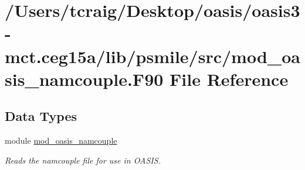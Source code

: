 \hypertarget{mod__oasis__namcouple_8_f90}{\section{/\+Users/tcraig/\+Desktop/oasis/oasis3-\/mct.ceg15a/lib/psmile/src/mod\+\_\+oasis\+\_\+namcouple.F90 File Reference}
\label{mod__oasis__namcouple_8_f90}
}
\subsection*{Data Types}
\begin{DoxyCompactItemize}
\item 
module \hyperlink{classmod__oasis__namcouple}{mod\+\_\+oasis\+\_\+namcouple}
\begin{DoxyCompactList}\small\item\em Reads the namcouple file for use in O\+A\+S\+I\+S. \end{DoxyCompactList}\end{DoxyCompactItemize}
